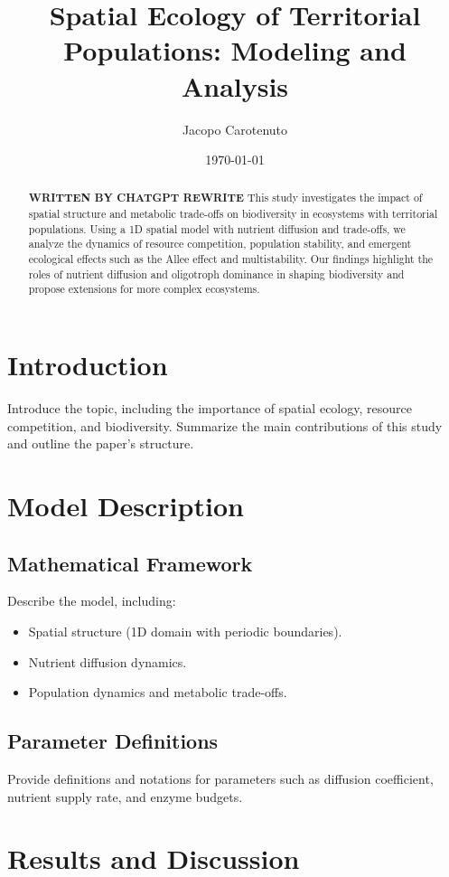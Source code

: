 \documentclass[a4paper,11pt]{article}
\title{Spatial Ecology of Territorial Populations: Modeling and Analysis}
\author[1]{Jacopo Carotenuto}
\affil[1]{University of Padova, Physics of Data}
\date{\today}
\begin{document}
\maketitle

\begin{abstract}
\textbf{WRITTEN BY CHATGPT REWRITE}
This study investigates the impact of spatial structure and metabolic trade-offs on biodiversity in ecosystems with territorial populations. Using a 1D spatial model with nutrient diffusion and trade-offs, we analyze the dynamics of resource competition, population stability, and emergent ecological effects such as the Allee effect and multistability. Our findings highlight the roles of nutrient diffusion and oligotroph dominance in shaping biodiversity and propose extensions for more complex ecosystems.
\end{abstract}

\section{Introduction}
Introduce the topic, including the importance of spatial ecology, resource competition, and biodiversity. Summarize the main contributions of this study and outline the paper's structure.

\section{Model Description}
\subsection{Mathematical Framework}
Describe the model, including:
\begin{itemize}
    \item Spatial structure (1D domain with periodic boundaries).
    \item Nutrient diffusion dynamics.
    \item Population dynamics and metabolic trade-offs.
\end{itemize}

\subsection{Parameter Definitions}
Provide definitions and notations for parameters such as diffusion coefficient, nutrient supply rate, and enzyme budgets.

\section{Results and Discussion}
\end{document}
